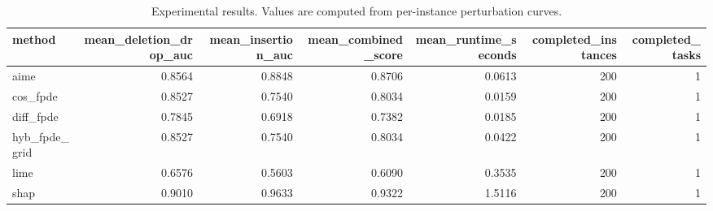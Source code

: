 \begin{table}[t]
\caption{Experimental results. Values are computed from per-instance perturbation curves.}
\label{tab:main_results_computed}
\centering
\begin{tabular}{lrrrrrr}
\toprule
method & mean\_deletion\_drop\_auc & mean\_insertion\_auc & mean\_combined\_score & mean\_runtime\_seconds & completed\_instances & completed\_tasks \\
\midrule
aime & 0.8564 & 0.8848 & 0.8706 & 0.0613 & 200 & 1 \\
cos\_fpde & 0.8527 & 0.7540 & 0.8034 & 0.0159 & 200 & 1 \\
diff\_fpde & 0.7845 & 0.6918 & 0.7382 & 0.0185 & 200 & 1 \\
hyb\_fpde\_grid & 0.8527 & 0.7540 & 0.8034 & 0.0422 & 200 & 1 \\
lime & 0.6576 & 0.5603 & 0.6090 & 0.3535 & 200 & 1 \\
shap & 0.9010 & 0.9633 & 0.9322 & 1.5116 & 200 & 1 \\
\bottomrule
\end{tabular}

\end{table}
